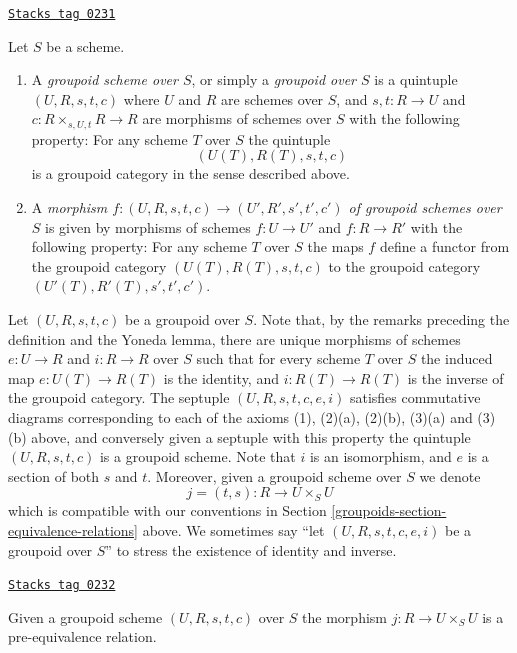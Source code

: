 \begin{definition}[Groupoid]
\label{groupoids-definition-groupoid}
\href{https://stacks.math.columbia.edu/tag/0231}{\texttt{Stacks tag 0231}}

Let $S$ be a scheme.
\begin{enumerate}
\item A {\it groupoid scheme over $S$}, or simply a
{\it groupoid over $S$} is a
quintuple $(U, R, s, t, c)$ where
$U$ and $R$ are schemes over $S$, and
$s, t : R \to U$ and $c : R \times_{s, U, t} R \to R$
are morphisms of schemes over $S$ with the
following property: For any scheme
$T$ over $S$ the quintuple
$$
(U(T), R(T), s, t, c)
$$
is a groupoid category in the sense described above.
\item A {\it morphism
$f : (U, R, s, t, c) \to (U', R', s', t', c')$
of groupoid schemes over $S$} is given by morphisms
of schemes $f : U \to U'$ and $f : R \to R'$ with the
following property:  For any scheme
$T$ over $S$ the maps $f$ define a functor from the
groupoid category $(U(T), R(T), s, t, c)$ to the
groupoid category $(U'(T), R'(T), s', t', c')$.
\end{enumerate}
\end{definition}

Let $(U, R, s, t, c)$ be a groupoid over $S$.
Note that, by the remarks preceding the definition and the Yoneda lemma,
there are unique morphisms of schemes
$e : U \to R$ and
$i : R \to R$ over $S$ such that for every scheme $T$ over $S$
the induced map $e : U(T) \to R(T)$ is the identity, and
$i : R(T) \to R(T)$ is the inverse of
the groupoid category. The septuple $(U, R, s, t, c, e, i)$
satisfies commutative diagrams corresponding to each of the
axioms (1), (2)(a), (2)(b), (3)(a) and (3)(b) above, and conversely
given a septuple with this property the quintuple $(U, R, s, t, c)$
is a groupoid scheme. Note that $i$ is an isomorphism,
and $e$ is a section of both $s$ and $t$.
Moreover, given a groupoid scheme over $S$ we denote
$$
j = (t, s) : R \longrightarrow U \times_S U
$$
which is compatible with our conventions in Section
\ref{groupoids-section-equivalence-relations} above.
We sometimes say ``let $(U, R, s, t, c, e, i)$ be a
groupoid over $S$'' to stress the existence of identity and
inverse.

\begin{lemma}
\label{groupoids-lemma-groupoid-pre-equivalence}
\href{https://stacks.math.columbia.edu/tag/0232}{\texttt{Stacks tag 0232}}

Given a groupoid scheme $(U, R, s, t, c)$ over $S$
the morphism $j : R \to U \times_S U$ is a pre-equivalence
relation.
\end{lemma}

